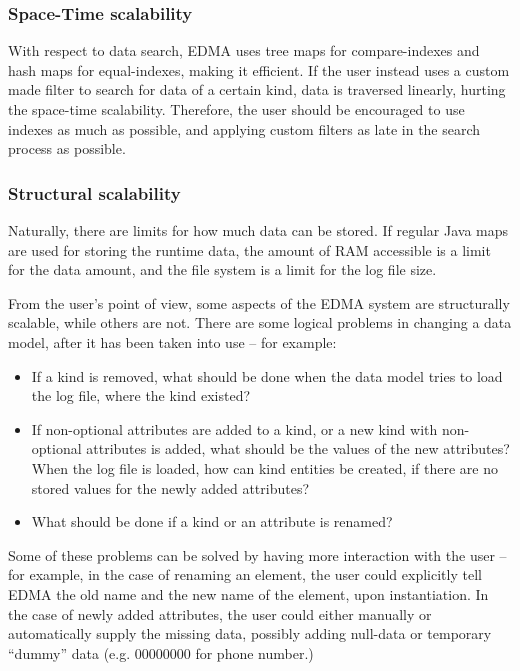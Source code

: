 \subsubsection{Space-Time scalability}

With respect to data search, EDMA uses tree maps for compare-indexes
and hash maps for equal-indexes, making it efficient. If the user
instead uses a custom made filter to search for data of a certain
kind, data is traversed linearly, hurting the space-time scalability.
Therefore, the user should be encouraged to use indexes as much as
possible, and applying custom filters as late in the search process
as possible.


\subsubsection{Structural scalability}

Naturally, there are limits for how much data can be stored. If regular
Java maps are used for storing the runtime data, the amount of RAM
accessible is a limit for the data amount, and the file system is
a limit for the log file size. 

From the user's point of view, some aspects of the EDMA system are
structurally scalable, while others are not. There are some logical
problems in changing a data model, after it has been taken into use
-- for example:
\begin{itemize}
\item If a kind is removed, what should be done when the data model tries
to load the log file, where the kind existed?
\item If non-optional attributes are added to a kind, or a new kind with
non-optional attributes is added, what should be the values of the
new attributes? When the log file is loaded, how can kind entities
be created, if there are no stored values for the newly added attributes?
\item What should be done if a kind or an attribute is renamed?
\end{itemize}
Some of these problems can be solved by having more interaction with
the user -- for example, in the case of renaming an element, the user
could explicitly tell EDMA the old name and the new name of the element,
upon instantiation. In the case of newly added attributes, the user
could either manually or automatically supply the missing data, possibly
adding null-data or temporary ``dummy'' data (e.g. 00000000 for
phone number.)

